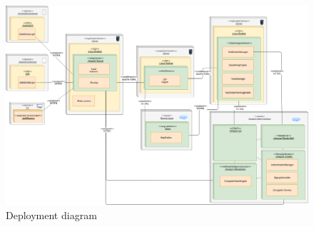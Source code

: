 \documentclass{article}
\begin{document}
	\begin{figure}[h]
		\includegraphics[width=\linewidth]{images/Deployment_diagram.png}
		\caption{Deployment diagram}
		\label{fig:Deployment}
	\end{figure}
	\newpage \FloatBarrier
\end{document}
